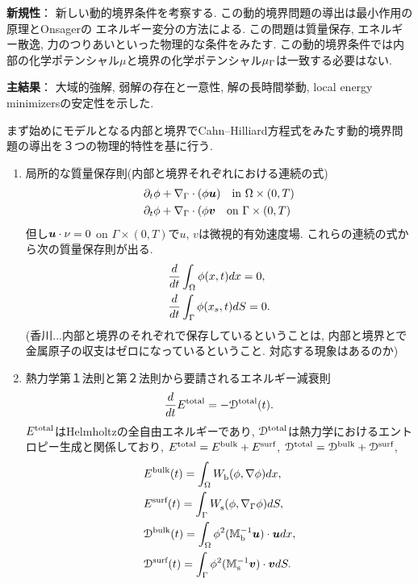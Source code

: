 \documentclass[a4paper]{jsarticle}
\begin{document}
{\bf 新規性}：
新しい動的境界条件を考察する.
この動的境界問題の導出は最小作用の原理とOnsagerの
エネルギー変分の方法による.
この問題は質量保存, エネルギー散逸, 力のつりあいといった物理的な条件をみたす.
この動的境界条件では内部の化学ポテンシャル$\mu$と境界の化学ポテンシャル$\mu_{\Gamma}$は一致する必要はない.

{\bf 主結果}：
大域的強解, 弱解の存在と一意性, 解の長時間挙動, local energy minimizersの安定性を示した.

まず始めにモデルとなる内部と境界でCahn--Hilliard方程式をみたす動的境界問題の導出を３つの物理的特性を基に行う.
\begin{enumerate}
	\item 局所的な質量保存則(内部と境界それぞれにおける連続の式)
	\begin{align}
		&\partial_t\phi + \nabla_{\Gamma}\cdot(\phi\bm{u})\quad\text{in }\Omega\times(0,T)\\
		&\partial_t\phi + \nabla_{\Gamma}\cdot(\phi\bm{v}\quad\text{on }\Gamma\times(0,T)
	\end{align}
	但し$\bm{u}\cdot\nu = 0$ on $\Gamma\times(0,T)$で$u$, $v$は微視的有効速度場.
	これらの連続の式から次の質量保存則が出る.
	\begin{align}
		&\frac{d}{dt}\int_{\Omega}\phi(x,t)dx = 0,\\
		&\frac{d}{dt}\int_{\Gamma}\phi(x_s,t)dS = 0.
	\end{align}
	(香川...内部と境界のそれぞれで保存しているということは, 内部と境界とで金属原子の収支はゼロになっているということ.
	対応する現象はあるのか)
	\item 熱力学第１法則と第２法則から要請されるエネルギー減衰則
	\begin{equation}
		\frac{d}{dt}{E}^{\text{total}}_{\text{}} = -{\mathcal{D}}^{\text{total}}_{\text{}}(t).
	\end{equation}
	${E}^{\text{total}}_{\text{}}$はHelmholtzの全自由エネルギーであり, ${\mathcal{D}}^{\text{total}}_{\text{}}$は熱力学におけるエントロピー生成と関係しており, ${E}^{\text{total}}_{\text{}} = {E}^{\text{bulk}}_{\text{}} + {E}^{\text{surf}}_{\text{}}$, ${\mathcal{D}}^{\text{total}}_{\text{}} = {\mathcal{D}}^{\text{bulk}}_{\text{}} + {\mathcal{D}}^{\text{surf}}_{\text{}}$,
	\begin{align}
		&\chara{E}{bulk}{}(t) = \INTO \chara{W}{}{b}(\phi,\nabla\phi)dx,\\
		&\chara{E}{surf}{}(t) = \INTG\chara{W}{}{s}(\phi,\nabla\sG\phi)dS,\\
		&\chara{\mathcal{D}}{bulk}{}(t) = \INTO\phi^2(\chara{\mathbb{M}}{$-1$}{b}\vector{u})\cdot\vector{u}dx,\\
		&\chara{\mathcal{D}}{surf}{}(t) = \INTG\phi^2(\chara{\mathbb{M}}{$-1$}{s}\vector{v})\cdot\vector{v}dS.

\end{align}
\end{enumerate}
\end{document}

